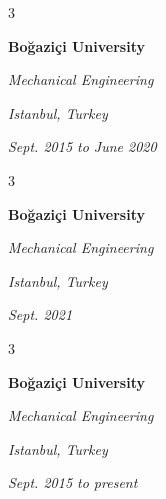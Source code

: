 \documentclass[10pt, letterpaper]{article}
\newenvironment{threecolentry}[3][]{
    \onecolentry
    \def\thirdColumn{#3}
    \setcolumnwidth{0.6 cm, \fill, 4.5 cm}
    \begin{paracol}{3}
    #2 \switchcolumn
}{
    \switchcolumn \raggedleft \thirdColumn
    \end{paracol}
    \endonecolentry
} %
\begin{document}
        \vspace{0.2 cm-3px}

        \begin{threecolentry}{
            \vspace*{\fill}
            \textbullet
            \vspace*{3px}
            \vspace*{\fill}
        }{
        \textit{Istanbul, Turkey}    
            
        \textit{Sept. 2015 to June 2020}}
            \textbf{Boğaziçi University}

            \textit{Mechanical Engineering}
        \end{threecolentry}



        \vspace{0.2 cm-3px}

        \begin{threecolentry}{
            \vspace*{\fill}
            \textbullet
            \vspace*{3px}
            \vspace*{\fill}
        }{
        \textit{Istanbul, Turkey}    
            
        \textit{Sept. 2021}}
            \textbf{Boğaziçi University}

            \textit{Mechanical Engineering}
        \end{threecolentry}



        \vspace{0.2 cm-3px}

        \begin{threecolentry}{
            \vspace*{\fill}
            \textbullet
            \vspace*{3px}
            \vspace*{\fill}
        }{
        \textit{Istanbul, Turkey}    
            
        \textit{Sept. 2015 to present}}
            \textbf{Boğaziçi University}

            \textit{Mechanical Engineering}
        \end{threecolentry}
\end{document}
